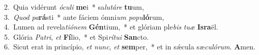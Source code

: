 {2.~}Quia vidérunt \textit{ó}\textit{cu}\textit{li} \textbf{me}i~* sa\textit{lu}\textit{tá}\textit{re} \textbf{tu}um,\\
{3.~}\textit{Quod} \textit{pa}\textbf{rá}sti~* ante fáciem ómni\textit{um} \textit{po}\textit{pu}\textbf{ló}rum,\\
{4.~}Lumen ad revela\textit{ti}\textit{ó}\textit{nem} \textbf{Gén}tium,~* et glóriam ple\textit{bis} \textit{tu}\textit{æ} \textbf{Is}\textbf{ra}ël.\\
{5.~}Glória \textit{Pa}\textit{tri}, \textit{et} \textbf{Fí}lio,~* et Spi\textit{rí}\textit{tu}\textit{i} \textbf{San}cto.\\
{6.~}Sicut erat in princípio, \textit{et} \textit{nunc}, \textit{et} \textbf{sem}per,~* et in sǽcula sæ\textit{cu}\textit{ló}\textit{rum}. \textbf{A}men.\\
